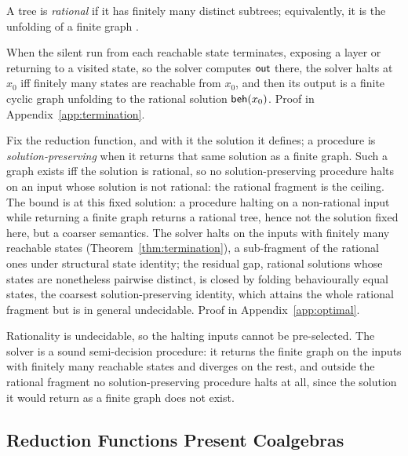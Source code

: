 \begin{definition}[Rational]\label{def:rational}
  A tree is \emph{rational} if it has finitely many distinct subtrees; equivalently, it is the
  unfolding of a finite graph \cite{courcelle1983-infinite-trees}.
\end{definition}

\begin{theorem}[Termination]\label{thm:termination}
  When the silent run from each reachable state terminates, exposing a layer or returning to a
  visited state, so the solver computes $\mathsf{out}$ there, the solver halts at $x_0$ iff finitely many
  states are reachable from $x_0$, and then its output is a finite cyclic graph unfolding to the
  rational solution $\mathsf{beh}(x_0)$. Proof in Appendix~\ref{app:termination}.
\end{theorem}

\begin{theorem}[Optimality]\label{thm:optimal}
  Fix the reduction function, and with it the solution it defines; a procedure is
  \emph{solution-preserving} when it returns that same solution as a finite graph. Such a graph
  exists iff the solution is rational, so no solution-preserving procedure halts on an input whose
  solution is not rational: the rational fragment is the ceiling. The bound is at this fixed
  solution: a procedure halting on a non-rational input while returning a finite graph returns a
  rational tree, hence not the solution fixed here, but a coarser semantics. The solver halts on
  the inputs with finitely many reachable states
  (Theorem~\ref{thm:termination}), a sub-fragment of the rational ones under structural state
  identity; the residual gap, rational solutions whose states are nonetheless pairwise distinct,
  is closed by folding behaviourally equal states, the coarsest solution-preserving identity,
  which attains the whole rational fragment but is in general undecidable. Proof in
  Appendix~\ref{app:optimal}.
\end{theorem}

\noindent
Rationality is undecidable, so the halting inputs cannot be pre-selected. The solver is a sound
semi-decision procedure: it returns the finite graph on the inputs with finitely many reachable
states and diverges on the rest, and outside the rational fragment no solution-preserving
procedure halts at all, since the solution it would return as a finite graph does not exist.

\subsection{Reduction Functions Present Coalgebras}\label{sec:reductions}


